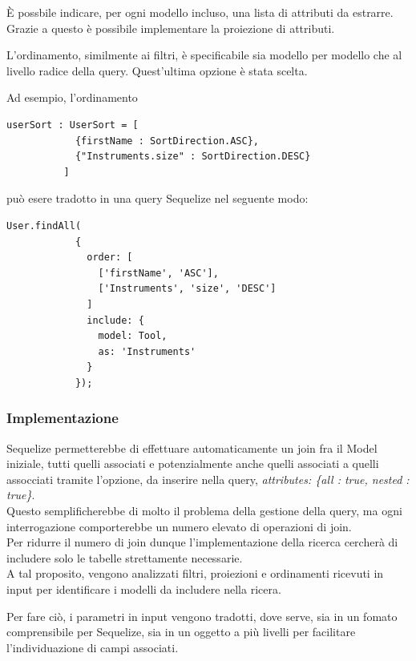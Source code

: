 \documentclass[a4paper, 12pt]{scrartcl}
\begin{document}
        È possbile indicare, per ogni modello incluso, una lista di attributi da estrarre. Grazie a questo è possibile implementare la proiezione di attributi.

        L'ordinamento, similmente ai filtri, è specificabile sia modello per modello che al livello radice della query. Quest'ultima opzione è stata scelta.

        Ad esempio, l'ordinamento
        \begin{Verbatim}[samepage=true]
          userSort : UserSort = [
            {firstName : SortDirection.ASC},
            {"Instruments.size" : SortDirection.DESC}
          ]
        \end{Verbatim}
        può esere tradotto in una query Sequelize nel seguente modo:
        \begin{Verbatim}[samepage=true]
          User.findAll(
            {
              order: [
                ['firstName', 'ASC'],
                ['Instruments', 'size', 'DESC']
              ]
              include: {
                model: Tool,
                as: 'Instruments'
              }
            });
        \end{Verbatim}

      \subsubsection*{Implementazione}
        Sequelize permetterebbe di effettuare automaticamente un join fra il Model iniziale, tutti quelli associati e potenzialmente anche quelli associati a quelli assocciati tramite l'opzione, da inserire nella query,
        \emph{attributes: \{all : true, nested : true\}}.\\
        Questo semplificherebbe di molto il problema della gestione della query, ma ogni interrogazione comporterebbe un numero elevato di operazioni di join.\\
        Per ridurre il numero di join dunque l'implementazione della ricerca cercherà di includere solo le tabelle strettamente necessarie.\\

        A tal proposito, vengono analizzati filtri, proiezioni e ordinamenti ricevuti in input per identificare i modelli da includere nella ricera.

        Per fare ciò, i parametri in input vengono tradotti, dove serve, sia in un fomato comprensibile per Sequelize, sia in un oggetto a più livelli per facilitare l'individuazione di campi associati.\\
\end{document}
